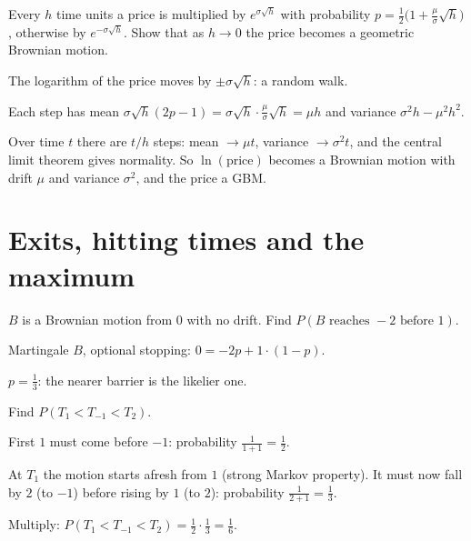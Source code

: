 \begin{problem}
Every $h$ time units a price is multiplied by $e^{\sigma\sqrt h}$ with probability $p=\frac12\big(1+\frac\mu\sigma\sqrt h\big)$, otherwise by $e^{-\sigma\sqrt h}$. Show that as $h\to0$ the price becomes a geometric Brownian motion.
\begin{steps}
  \item The logarithm of the price moves by $\pm\sigma\sqrt h$: a random walk.
  \item Each step has mean $\sigma\sqrt h(2p-1)=\sigma\sqrt h\cdot\frac\mu\sigma\sqrt h=\mu h$ and variance $\sigma^2h-\mu^2h^2$.
  \item Over time $t$ there are $t/h$ steps: mean $\to\mu t$, variance $\to\sigma^2t$, and the central limit theorem gives normality. So $\ln(\text{price})$ becomes a Brownian motion with drift $\mu$ and variance $\sigma^2$, and the price a GBM.
\end{steps}
\end{problem}

\section{Exits, hitting times and the maximum}

\begin{problem}
$B$ is a Brownian motion from $0$ with no drift. Find $P(B\text{ reaches }-2\text{ before }1)$.
\begin{steps}
  \item Martingale $B$, optional stopping: $0=-2p+1\cdot(1-p)$.
  \item $p=\frac13$: the nearer barrier is the likelier one.
\end{steps}
\end{problem}

\begin{problem}
Find $P(T_1<T_{-1}<T_2)$.
\begin{steps}
  \item First $1$ must come before $-1$: probability $\frac{1}{1+1}=\frac12$.
  \item At $T_1$ the motion starts afresh from $1$ (strong Markov property). It must now fall by $2$ (to $-1$) before rising by $1$ (to $2$): probability $\frac{1}{2+1}=\frac13$.
  \item Multiply: $P(T_1<T_{-1}<T_2)=\frac12\cdot\frac13=\frac16$.
\end{steps}
\end{problem}

